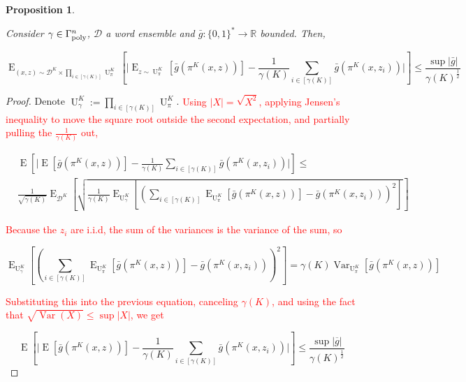 \documentclass[11pt]{article}
\numberwithin{equation}{section}
\theoremstyle{definition}
\theoremstyle{plain}
\newtheorem{proposition}{Proposition}[section]
\newcommand{\Bool}{\{0,1\}}
\newcommand{\Words}{{\Bool^*}}
\DeclareMathOperator{\E}{E}
\DeclareMathOperator{\Var}{Var}
\DeclareMathOperator{\Un}{U}
\newcommand{\Reals}{\mathbb{R}}
\newcommand{\Abs}[1]{\lvert #1 \rvert}
\newcommand{\Dist}{\mathcal{D}}
\newcommand{\GammaPoly}{\Gamma_{\textnormal{poly}}}
\begin{document}
\begin{samepage}
\begin{proposition}
\label{prp:ev_equiv_mean}

Consider $\gamma \in \GammaPoly^n$, $\Dist$ a word ensemble and $\bar{g}: \Words \rightarrow \Reals$ bounded. Then,

\begin{equation}
\E_{(x,z) \sim \Dist^{K} \times \prod_{i \in [\gamma(K)]} \Un_\pi^K}[\Abs{\E_{z \sim \Un_\pi^{K}}[\bar{g}(\pi^{K}(x,z))]-\frac{1}{\gamma(K)} \sum_{i \in [\gamma(K)]} \bar{g}(\pi^K(x,z_i))}] \leq \frac{\sup \Abs{\bar{g}}}{\gamma(K)^{\frac{1}{2}}}
\end{equation}

\end{proposition}
\end{samepage}

\begin{proof}

Denote $\Un_\gamma^K:=\prod_{i \in [\gamma(K)]} \Un_\pi^K$. \textcolor{red}{Using $\Abs{X}=\sqrt{X^2}$, applying Jensen's inequality to move the square root outside the second expectation, and partially pulling the $\frac{1}{\gamma(K)}$ out,}

\begin{align*}
&\E[\Abs{\E[\bar{g}(\pi^{K}(x,z))]-\frac{1}{\gamma(K)} \sum_{i \in [\gamma(K)]} \bar{g}(\pi^K(x,z_i))}] \leq\\ &\frac{1}{\sqrt{\gamma(K)}}\E_{\Dist^{K}}\left[\sqrt{\frac{1}{\gamma(K)}\E_{\Un_\gamma^K}\left[\left(\sum_{i\in[\gamma(K)]}\E_{\Un_\pi^K}[\bar{g}(\pi^{K}(x,z))]- \bar{g}(\pi^K(x,z_i))\right)^2\right]}\right]
\end{align*}

\textcolor{red}{Because the $z_{i}$ are i.i.d, the sum of the variances is the variance of the sum, so}

\[\E_{\Un_\gamma^K}\left[\left(\sum_{i\in[\gamma(K)]}\E_{\Un_\pi^K}[\bar{g}(\pi^{K}(x,z))]- \bar{g}(\pi^K(x,z_i))\right)^2\right]=\gamma(K)\Var_{\Un_\pi^K}[\bar{g}(\pi^{K}(x,z))]\]

\textcolor{red}{Substituting this into the previous equation, canceling $\gamma(K)$, and using the fact that $\sqrt{\Var(X)}\le\sup\Abs{X}$, we get}

\[\E[\Abs{\E[\bar{g}(\pi^{K}(x,z))]-\frac{1}{\gamma(K)} \sum_{i \in [\gamma(K)]} \bar{g}(\pi^K(x,z_i))}] \leq \frac{\sup\Abs{\overline{g}}}{\gamma(K)^{\frac{1}{2}}}\]
%
\end{proof}
\end{document}
